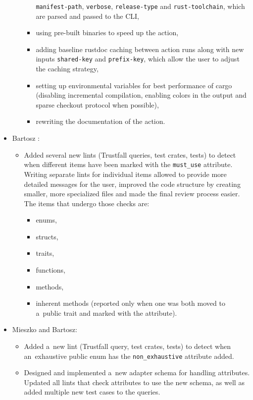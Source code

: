 \documentclass[licencjacka,en]{pracamgr}
\begin{document}
\begin{itemize}
\begin{itemize}
\begin{itemize}
					\texttt{manifest-path}, \texttt{verbose}, \texttt{release-type}
					and \texttt{rust-toolchain}, which are parsed and passed to the CLI,
				\item using pre-built binaries to speed up the action,
				\item adding baseline rustdoc caching between action runs along with new
					inputs \texttt{shared-key} and \texttt{prefix-key}, which allow the user
					to adjust the caching strategy,
				\item setting up environmental variables for best performance of cargo (disabling
					incremental compilation, enabling colors in the output and sparse
					checkout protocol when possible),
				\item rewriting the documentation of the action.
			\end{itemize}
		\end{itemize}

	\item Bartosz \cite{responsibilities-bartosz}:
		\begin{itemize}
			\item Added several new lints (Trustfall queries, test crates, tests) to detect
				when different items have been marked with the \texttt{must\_use} attribute.
				Writing separate lints for individual items allowed to provide more detailed
				messages for the user, improved the code structure by creating smaller,
				more specialized files and made the final review process easier. The items that
				undergo those checks are:
				\begin{itemize}
					\item enums,
					\item structs,
					\item traits,
					\item functions,
					\item methods,
					\item inherent methods (reported only when one was both moved to a~public trait
						and marked with the attribute).
				\end{itemize}
		\end{itemize}

	\item Mieszko and Bartosz:
		\begin{itemize}
			\item Added a~new lint (Trustfall query, test crates, tests) to detect when
				an~exhaustive public enum has the \texttt{non\_exhaustive} attribute added.
			\item Designed and implemented a~new adapter schema for handling attributes.
				Updated all lints that check attributes to use the new schema, as well as added
				multiple new test cases to the queries.
		\end{itemize}
\end{itemize}
\end{document}
